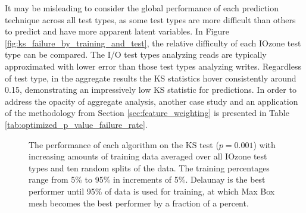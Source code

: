 It may be misleading to consider the global performance of each prediction technique across all test types, as some test types are more difficult than others to predict and have more apparent latent variables. In Figure \ref{fig:ks_failure_by_training_and_test}, the relative difficulty of each IOzone test type can be compared. The I/O test types analyzing reads are typically approximated with lower error than those test types analyzing writes. Regardless of test type, in the aggregate results the KS statistics hover consistently around 0.15, demonstrating an impressively low KS statistic for predictions. In order to address the opacity of aggregate analysis, another case study and an application of the methodology from Section \ref{sec:feature_weighting} is presented in Table \ref{tab:optimized_p_value_failure_rate}.

\begin{figure}
  \centering
  \caption{The performance of each algorithm on the KS test ($p=0.001$) with increasing amounts of training data averaged over all IOzone test types and ten random splits of the data. The training percentages range from 5\% to 95\% in increments of 5\%. Delaunay is the best performer until 95\% of data is used for training, at which Max Box mesh becomes the best performer by a fraction of a percent.}
  \label{fig:ks_failure_by_training}
\end{figure}

